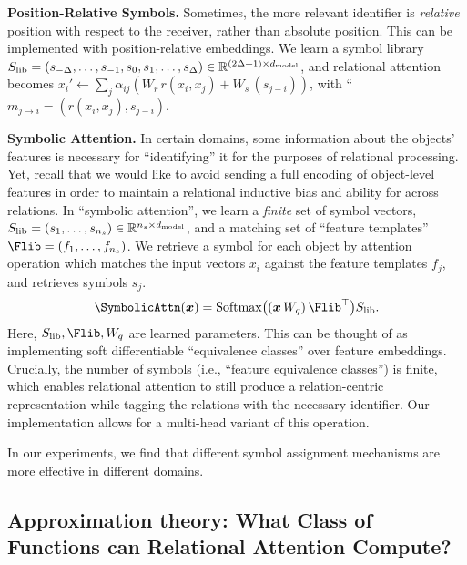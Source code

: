 \textbf{Position-Relative Symbols.} Sometimes, the more relevant identifier is \textit{relative} position with respect to the receiver, rather than absolute position. This can be implemented with position-relative embeddings. We learn a symbol library $S_\mathrm{lib} = (s_{-\Delta}, \ldots, s_{-1}, s_0, s_1, \ldots, s_{\Delta}) \in \mathbb{R}^{(2 \Delta + 1) \times d_{\mathrm{model}}}$, and relational attention becomes $x_i' \gets \sum_{j} \alpha_{ij} (W_r \, r(x_i, x_j) + W_s \, (s_{j-i}))$, with ``$m_{j \to i} = (r(x_i, x_j), s_{j-i})$.

\textbf{Symbolic Attention.} In certain domains, some information about the objects' features is necessary for ``identifying'' it for the purposes of relational processing. Yet, recall that we would like to avoid sending a full encoding of object-level features in order to maintain a relational inductive bias and ability for  across relations. In ``symbolic attention'', we learn a \textit{finite} set of symbol vectors, $S_\mathrm{lib} = (s_1, \ldots, s_{n_s}) \in \mathbb{R}^{n_s \times d_{\mathrm{model}}}$, and a matching set of ``feature templates'' $\Flib = (f_1, \ldots, f_{n_s})$. We retrieve a symbol for each object by attention operation which matches the input vectors 
$x_i$ against the feature templates $f_j$, and retrieves symbols $s_j$.
\begin{equation}
  \SymbolicAttn(\x) = \Softmax\bigparen{(\x \, W_q)\, \Flib^\top} \Slib.
\end{equation}
Here, $\Slib, \Flib, W_q$ are learned parameters. This can be thought of as implementing soft differentiable ``equivalence classes'' over feature embeddings. Crucially, the number of symbols (i.e., ``feature equivalence classes'') is finite, which enables relational attention to still produce a relation-centric representation while tagging the relations with the necessary identifier. Our implementation allows for a multi-head variant of this operation.

In our experiments, we find that different symbol assignment mechanisms are more effective in different domains.



\subsection{Approximation theory: What Class of Functions can Relational Attention Compute?}

